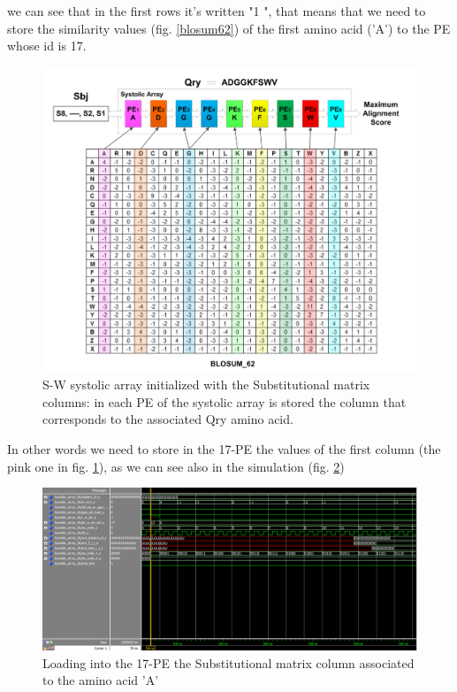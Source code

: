 we can see that in the first rows it's written "1 ", that means that we need to store the similarity values (fig. \ref{blosum62}) of the first amino acid ('A') to the PE whose id is 17.
\begin{figure}[h!]
	\centering
	\includegraphics[width=\textwidth]{imm/sw/tb_sw1.png} 	\caption{S-W systolic array initialized with the Substitutional matrix columns: in each PE of the systolic array is stored the column that corresponds to the associated Qry amino acid.} 
	\label{tb_sw1}
\end{figure}

In other words we need to store in the 17-PE the values of the first column (the pink one in fig. \ref{tb_sw1}), as we can see also in the simulation (fig. \ref{tb_load_17})\clearpage
\begin{figure}[h!]
	\centering
	\includegraphics[width=\textwidth]{imm/sw/load_pe17_AA1.png}
	 	\caption{Loading into the 17-PE the Substitutional matrix column associated to the amino acid 'A'} 
	\label{tb_load_17}
\end{figure}

